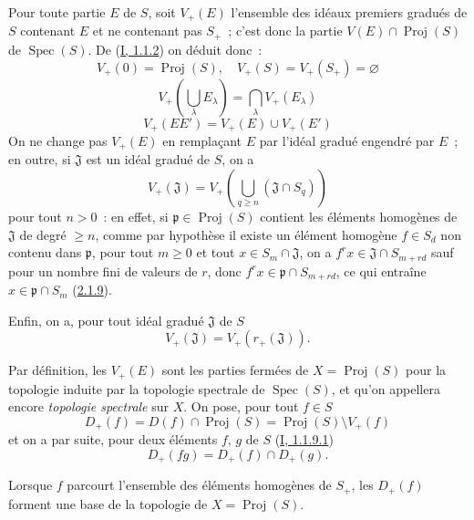 \begin{env}[2.3.2]
\label{II.2.3.2-fr}
Pour toute partie $E$ de $S$, soit $V_+(E)$ l'ensemble des idéaux premiers
gradués de $S$ contenant $E$ et ne contenant pas $S_+$~; c'est donc la
partie $V(E)\cap\operatorname{Proj}(S)$ de
$\operatorname{Spec}(S)$. De (\hyperref[I.1.1.2-fr]{I, 1.1.2}) on déduit
donc~:
\[
  \label{II.2.3.2.1-fr}
  V_+(0)=\operatorname{Proj}(S),\quad
  V_+(S)=V_+(S_+)=\varnothing
  \tag{2.3.2.1}
\]
\[
  \label{II.2.3.2.2-fr}
  V_+\left(\bigcup_\lambda E_\lambda\right)
  =\bigcap_\lambda V_+(E_\lambda)
  \tag{2.3.2.2}
\]
\[
  \label{II.2.3.2.3-fr}
  V_+(EE')=V_+(E)\cup V_+(E')
  \tag{2.3.2.3}
\]
On ne change pas $V_+(E)$ en remplaçant $E$ par l'idéal gradué engendré par
$E$~; en outre, si $\mathfrak{J}$ est un idéal gradué de $S$, on a
\[
  \label{II.2.3.2.4-fr}
  V_+(\mathfrak{J})
  =V_+\left(\bigcup_{q\geq n}(\mathfrak{J}\cap S_q)\right)
  \tag{2.3.2.4}
\]
pour tout $n>0$~: en effet, si
$\mathfrak{p}\in\operatorname{Proj}(S)$ contient les éléments homogènes de
$\mathfrak{J}$ de degré $\geq n$, comme par hypothèse il existe un élément
homogène $f\in S_d$ non contenu dans $\mathfrak{p}$, pour tout $m\geq 0$ et
tout $x\in S_m\cap\mathfrak{J}$, on a
$f^r x\in\mathfrak{J}\cap S_{m+rd}$ sauf pour un nombre fini de valeurs de
$r$, donc $f^r x\in\mathfrak{p}\cap S_{m+rd}$, ce qui entraîne
$x\in\mathfrak{p}\cap S_m$
(\hyperref[II.2.1.9-fr]{2.1.9}).

Enfin, on a, pour tout idéal gradué $\mathfrak{J}$ de $S$
\[
  \label{II.2.3.2.5-fr}
  V_+(\mathfrak{J})=V_+(r_+(\mathfrak{J})).
  \tag{2.3.2.5}
\]
\end{env}

\begin{env}[2.3.3]
\label{II.2.3.3-fr}
Par définition, les $V_+(E)$ sont les parties fermées de
$X=\operatorname{Proj}(S)$ pour la topologie induite par la topologie
spectrale de $\operatorname{Spec}(S)$, et qu'on appellera encore
\emph{topologie spectrale} sur $X$. On pose, pour tout $f\in S$
\[
  \label{II.2.3.3.1-fr}
  D_+(f)=D(f)\cap\operatorname{Proj}(S)
  =\operatorname{Proj}(S)\setminus V_+(f)
  \tag{2.3.3.1}
\]
et on a par suite, pour deux éléments $f$, $g$ de $S$
(\hyperref[I.1.1.9.1-fr]{I, 1.1.9.1})
\[
  \label{II.2.3.3.2-fr}
  D_+(fg)=D_+(f)\cap D_+(g).
  \tag{2.3.3.2}
\]
\end{env}

\begin{proposition}[2.3.4]
\label{II.2.3.4-fr}
Lorsque $f$ parcourt l'ensemble des éléments homogènes de $S_+$, les
$D_+(f)$ forment une base de la topologie de
$X=\operatorname{Proj}(S)$.
\end{proposition}

